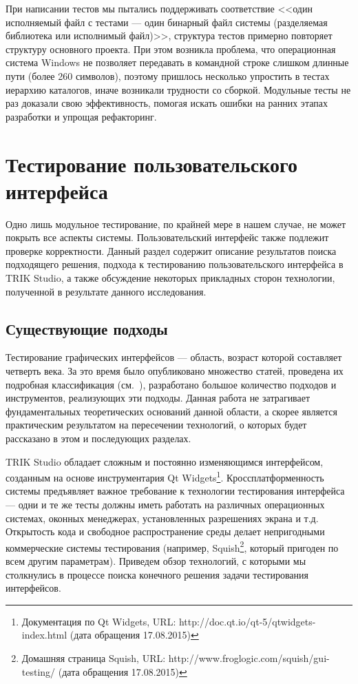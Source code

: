 \documentclass[conference]{IEEEtran}
\begin{document}
При написании тестов мы пытались поддерживать соответствие <<один исполняемый файл с тестами --- один бинарный файл системы 
(разделяемая библиотека или исполнимый файл)>>, структура тестов примерно повторяет структуру основного 
проекта. При этом возникла проблема, что операционная система Windows не позволяет передавать в командной 
строке слишком длинные пути (более 260 символов), поэтому пришлось несколько упростить в тестах иерархию 
каталогов, иначе возникали трудности со сборкой. Модульные тесты не раз доказали свою эффективность, помогая 
искать ошибки на ранних этапах разработки и упрощая рефакторинг.

\section{Тестирование пользовательского интерфейса}
Одно лишь модульное тестирование, по крайней мере в нашем случае, не может покрыть все аспекты системы. 
Пользовательский интерфейс также подлежит проверке корректности. Данный раздел содержит описание результатов 
поиска подходящего решения, подхода к тестированию пользовательского интерфейса в TRIK Studio, а также 
обсуждение некоторых прикладных сторон технологии, полученной в результате данного исследования.

\subsection{Существующие подходы}
Тестирование графических интерфейсов --- область, возраст которой составляет четверть века. За это время 
было опубликовано множество статей, проведена их подробная классификация (см.~\cite{banerjee2013graphical}), 
разработано большое количество подходов и инструментов, реализующих эти подходы. Данная работа не затрагивает 
фундаментальных теоретических оснований данной области, а скорее является практическим результатом на 
пересечении технологий, о которых будет рассказано в этом и последующих разделах.

TRIK Studio обладает сложным и постоянно изменяющимся интерфейсом, созданным на основе инструментария 
Qt Widgets\footnote{Документация по Qt Widgets, URL: http://doc.qt.io/qt-5/qtwidgets-index.html (дата обращения 17.08.2015)}. 
Кроссплатформенность системы предъявляет важное требование к технологии тестирования интерфейса --- одни 
и те же тесты должны иметь работать на различных операционных системах, оконных менеджерах, установленных 
разрешениях экрана и т.д. Открытость кода и свободное распространение среды делает непригодными коммерческие 
системы тестирования (например, Squish\footnote{Домашняя страница Squish, URL: http://www.froglogic.com/squish/gui-testing/ (дата обращения 17.08.2015)}, 
который пригоден по всем другим параметрам). Приведем обзор технологий, с которыми мы столкнулись в процессе 
поиска конечного решения задачи тестирования интерфейсов.
\end{document}
